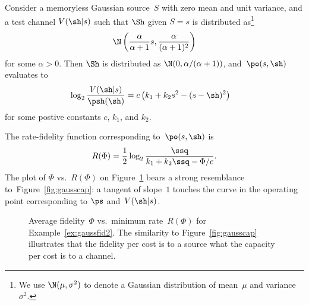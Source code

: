 \begin{example}[Gaussian]
  \label{ex:gaussfid2}
  Consider a memoryless Gaussian source~$S$ with zero mean and unit variance,
  and a test channel $V(\sh|s)$ such that $\Sh$ given $S=s$ is distributed
  as\footnote{We use $\N(\mu, \sigma^2)$ to denote a Gaussian distribution of
  mean~$\mu$ and variance~$\sigma^2$.}
  \[ \N\left( \frac{\alpha}{\alpha+1}s, \frac{ \alpha}{(\alpha+1)^2}
  \right) \]
  for some $\alpha > 0$. Then $\Sh$ is distributed as $\N(0, \alpha /
  (\alpha + 1))$, and~$\po(s,\sh)$ evaluates to
  \begin{align*}
    \log_2 \frac{V(\sh|s)}{\psh(\sh)} 
    &= c \left( k_1 + k_2 s^2 -(s-\sh)^2 \right)
  \end{align*}
  for some postive constants $c$, $k_1$, and $k_2$.
  
  The rate-fidelity function corresponding to~$\po(s,\sh)$ is
  \begin{equation*}
    R(\Phi) = \frac{1}{2} \log_2 \frac{\ssq}{k_1 + k_2 \ssq - \Phi/c}.
  \end{equation*}
  The plot of $\Phi$ vs.\ $R(\Phi)$ on Figure~\ref{fig:ratefidplot} bears a
  strong resemblance to~Figure~\ref{fig:gausscap}: a tangent of slope~$1$
  touches the curve in the operating point corresponding to $\ps$
  and~$V(\sh|s)$. 
  \begin{figure}
    \begin{center}
    \end{center}
    \caption{Average fidelity~$\Phi$ vs.\ minimum rate~$R(\Phi)$ for
    Example~\ref{ex:gaussfid2}. The similarity to Figure~\ref{fig:gausscap}
    illustrates that the fidelity per cost is to a source what the capacity per
    cost is to a channel.}
    \label{fig:ratefidplot}
  \end{figure}
\end{example}

